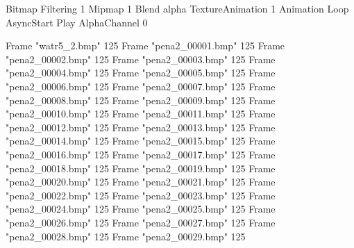{Bitmap
	{Filtering 1}
	{Mipmap 1}
	{Blend alpha}
	{TextureAnimation 1}
	{Animation Loop AsyncStart Play}
	{AlphaChannel 0}

	{Frame "watr5_2.bmp" 125}
	{Frame "pena2_00001.bmp" 125}
	{Frame "pena2_00002.bmp" 125}
	{Frame "pena2_00003.bmp" 125}
	{Frame "pena2_00004.bmp" 125}
	{Frame "pena2_00005.bmp" 125}
	{Frame "pena2_00006.bmp" 125}
	{Frame "pena2_00007.bmp" 125}
	{Frame "pena2_00008.bmp" 125}
	{Frame "pena2_00009.bmp" 125}
	{Frame "pena2_00010.bmp" 125}
	{Frame "pena2_00011.bmp" 125}
	{Frame "pena2_00012.bmp" 125}
	{Frame "pena2_00013.bmp" 125}
	{Frame "pena2_00014.bmp" 125}
	{Frame "pena2_00015.bmp" 125}
	{Frame "pena2_00016.bmp" 125}
	{Frame "pena2_00017.bmp" 125}
	{Frame "pena2_00018.bmp" 125}
	{Frame "pena2_00019.bmp" 125}
	{Frame "pena2_00020.bmp" 125}
	{Frame "pena2_00021.bmp" 125}
	{Frame "pena2_00022.bmp" 125}
	{Frame "pena2_00023.bmp" 125}
	{Frame "pena2_00024.bmp" 125}
	{Frame "pena2_00025.bmp" 125}
	{Frame "pena2_00026.bmp" 125}
	{Frame "pena2_00027.bmp" 125}
	{Frame "pena2_00028.bmp" 125}
	{Frame "pena2_00029.bmp" 125}
}